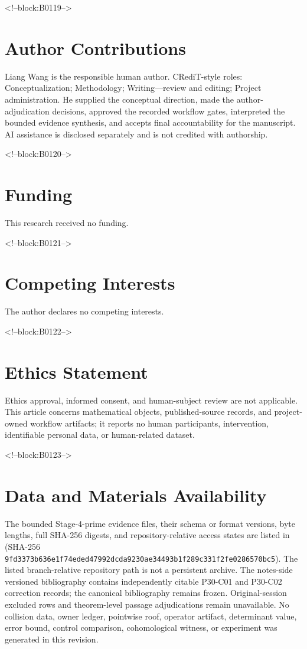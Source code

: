 \documentclass[11pt,a4paper]{article}
\begin{document}
<!--block:B0119-->
\section*{Author Contributions}
Liang Wang is the responsible human author. CRediT-style roles: Conceptualization; Methodology; Writing---review and editing; Project administration. He supplied the conceptual direction, made the author-adjudication decisions, approved the recorded workflow gates, interpreted the bounded evidence synthesis, and accepts final accountability for the manuscript. AI assistance is disclosed separately and is not credited with authorship.

<!--block:B0120-->
\section*{Funding}
This research received no funding.

<!--block:B0121-->
\section*{Competing Interests}
The author declares no competing interests.

<!--block:B0122-->
\section*{Ethics Statement}
Ethics approval, informed consent, and human-subject review are not applicable. This article concerns mathematical objects, published-source records, and project-owned workflow artifacts; it reports no human participants, intervention, identifiable personal data, or human-related dataset.

<!--block:B0123-->
\section*{Data and Materials Availability}
The bounded Stage-4-prime evidence files, their schema or format versions,
byte lengths, full SHA-256 digests, and repository-relative access states are
listed in 
(SHA-256 \texttt{9fd3373b636e1f74eded47992dcda9230ae34493b1f289c331f2fe0286570bc5}).  The listed branch-relative repository path
is not a persistent archive.  The notes-side versioned bibliography contains
independently citable P30-C01 and P30-C02 correction records; the canonical
bibliography remains frozen.  Original-session excluded rows and theorem-level
passage adjudications remain unavailable.  No collision data, owner ledger,
pointwise roof, operator artifact, determinant value, error bound, control
comparison, cohomological witness, or experiment was generated in this revision.
\end{document}
